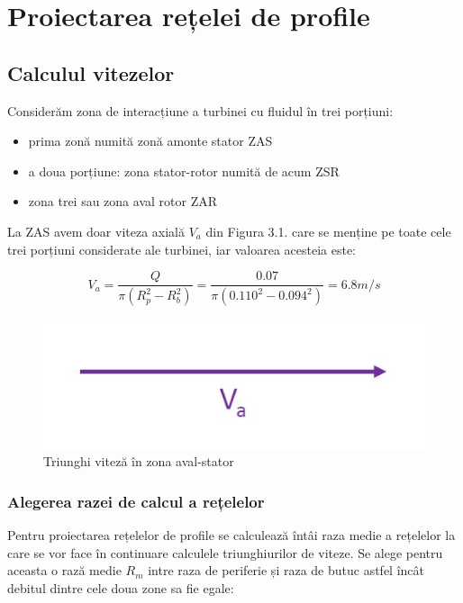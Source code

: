 \chapter{Proiectarea rețelei de profile} \label{chapter:proiectarea}

\section{Calculul vitezelor}

Considerăm zona de interacțiune a turbinei cu fluidul în trei porțiuni:
\begin{itemize}
	\item prima zonă numită zonă amonte stator ZAS
	\item a doua porțiune: zona stator-rotor numită de acum ZSR
	\item zona trei sau zona aval rotor ZAR
\end{itemize}

La ZAS avem doar viteza axială $V_{a}$ din Figura 3.1. care se menține pe toate cele trei porțiuni considerate ale turbinei, iar valoarea acesteia este:

\begin{equation}
V_a=\frac{Q}{\pi(R_{p}^2 - R_{b}^2)} = \frac{0.07}{\pi(0.110^2 - 0.094^2)} = 6.8\si{m/s}
\end{equation}

\begin{figure}[h!]
	\centering
	\includegraphics[scale=0.4]{figures/triunghi_viteza_ZAS.jpg}
	\caption{Triunghi viteză în zona aval-stator}
	\label{Triunghi viteză în zona aval-stator}
\end{figure}

\subsection{Alegerea razei de calcul a rețelelor}

Pentru proiectarea rețelelor de profile se calculează întâi raza medie a rețelelor la care se vor face în continuare calculele triunghiurilor de viteze. Se alege pentru aceasta o rază medie $R_m$ intre raza de periferie și raza de butuc astfel încât debitul dintre cele doua zone sa fie egale:

